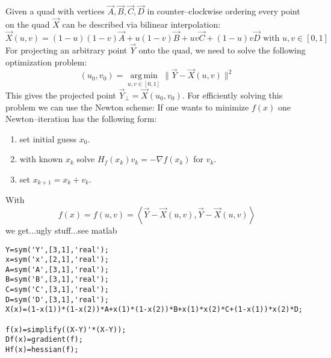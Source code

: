 \documentclass[10pt,a4paper]{article}
\newcommand{\norm}[1]{\parallel #1 \parallel}
\DeclareMathOperator*{\argmin}{arg\,min}
\begin{document}
Given a quad with vertices $\vec{A},\vec{B},\vec{C},\vec{D}$ in counter--clockwise ordering every point on the quad $\vec{X}$ can be described via bilinear interpolation:
\begin{equation*}
\vec{X}\left(u,v\right)=(1-u)(1-v)\vec{A}+u(1-v)\vec{B}+uv\vec{C}+(1-u)v\vec{D}\text{\ with\ }u,v\in\left[0,1\right]
\end{equation*}
For projecting an arbitrary point $\vec{Y}$ onto the quad, we need to solve the following optimization problem:
\begin{equation*}
\left(u_0,v_0\right)=\underset{u,v\in\left[0,1\right]}{\argmin}\norm{\vec{Y}-\vec{X}(u,v)}^2
\end{equation*}
This gives the projected point $\vec{Y}_\perp=\vec{X}\left(u_0,v_0\right)$.
For efficiently solving this problem we can use the Newton scheme:
If one wants to minimize $f\left(x\right)$ one Newton--iteration has the following form:
\begin{enumerate}
\item set initial guess $x_0$.
\item with known $x_k$ solve $H_f\left(x_k\right)v_k=-\nabla f\left(x_k\right)$ for $v_k$.
\item set $x_{k+1}=x_k+v_k$.
\end{enumerate} 
With
\begin{equation*}
f\left(x\right)=f\left(u,v\right)=\left\langle \vec{Y}-\vec{X}(u,v),\vec{Y}-\vec{X}(u,v)\right\rangle\end{equation*}
we get...ugly stuff...see matlab
\begin{verbatim}
Y=sym('Y',[3,1],'real');
x=sym('x',[2,1],'real');
A=sym('A',[3,1],'real');
B=sym('B',[3,1],'real');
C=sym('C',[3,1],'real');
D=sym('D',[3,1],'real');
X(x)=(1-x(1))*(1-x(2))*A+x(1)*(1-x(2))*B+x(1)*x(2)*C+(1-x(1))*x(2)*D;

f(x)=simplify((X-Y)'*(X-Y));
Df(x)=gradient(f);
Hf(x)=hessian(f);
\end{verbatim}
\end{document}
